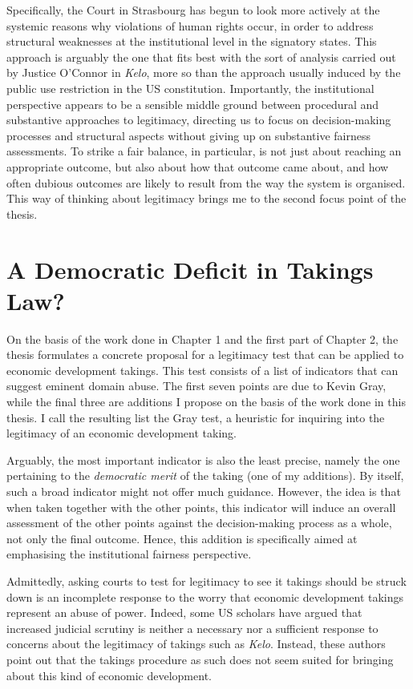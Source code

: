 Specifically, the Court in Strasbourg has begun to look more actively at the systemic reasons why violations of human rights occur, in order to address structural weaknesses at the institutional level in the signatory states. This approach is arguably the one that fits best with the sort of analysis carried out by Justice O'Connor in {\it Kelo}, more so than the approach usually induced by the public use restriction in the US constitution. Importantly, the institutional perspective appears to be a sensible middle ground between procedural and substantive approaches to legitimacy, directing us to focus on decision-making processes and structural aspects without giving up on substantive fairness assessments. To strike a fair balance, in particular, is not just about reaching an appropriate outcome, but also about how that outcome came about, and how often dubious outcomes are likely to result from the way the system is organised. This way of thinking about legitimacy brings me to the second focus point of the thesis.

\section{A Democratic Deficit in Takings Law?}\label{sec:1:2}

On the basis of the work done in Chapter 1 and the first part of Chapter 2, the thesis formulates a concrete proposal for a legitimacy test that can be applied to economic development takings. This test consists of a list of indicators that can suggest eminent domain abuse. The first seven points are due to Kevin Gray, while the final three are additions I propose on the basis of the work done in this thesis. I call the resulting list the Gray test, a heuristic for inquiring into the legitimacy of an economic development taking.

Arguably, the most important indicator is also the least precise, namely the one pertaining to the {\it democratic merit} of the taking (one of my additions). By itself, such a broad indicator might not offer much guidance. However, the idea is that when taken together with the other points, this indicator will induce an overall assessment of the other points against the decision-making process as a whole, not only the final outcome. Hence, this addition is specifically aimed at emphasising the institutional fairness perspective.

Admittedly, asking courts to test for legitimacy to see it takings should be struck down is an incomplete response to the worry that economic development takings represent an abuse of power. Indeed, some US scholars have argued that increased judicial scrutiny is neither a necessary nor a sufficient response to concerns about the legitimacy of takings such as {\it Kelo}. Instead, these authors point out that the takings procedure as such does not seem suited for bringing about this kind of economic development.

